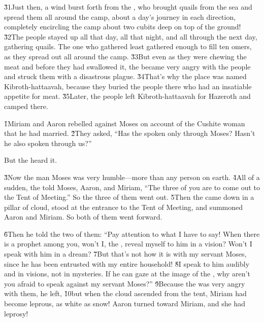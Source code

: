 \v{31}Just then, a wind burst forth from the , who brought quails from the sea and spread them all around the camp, about a day's journey in each direction, completely encircling the camp about two cubits deep on top of the ground! \v{32}The people stayed up all that day, all that night, and all through the next day, gathering quails. The one who gathered least gathered enough to fill ten omers, as they spread out all around the camp. \v{33}But even as they were chewing the meat and before they had swallowed it, the  became very angry with the people and struck them with a disastrous plague. \v{34}That's why the place was named Kibroth-hattaavah, because they buried the people there who had an insatiable appetite for meat. \v{35}Later, the people left Kibroth-hattaavah for Hazeroth and camped there.

\v{1}Miriam and Aaron rebelled against Moses on account of the Cushite woman that he had married. \v{2}They asked, ``Has the  spoken only through Moses? Hasn't he also spoken through us?''

But the  heard it.

\v{3}Now the man Moses was very humble---more than any person on earth. \v{4}All of a sudden, the  told Moses, Aaron, and Miriam, ``The three of you are to come out to the Tent of Meeting.'' So the three of them went out. \v{5}Then the  came down in a pillar of cloud, stood at the entrance to the Tent of Meeting, and summoned Aaron and Miriam. So both of them went forward.

\v{6}Then he told the two of them: ``Pay attention to what I have to say! When there is a prophet among you, won't I, the , reveal myself to him in a vision? Won't I speak with him in a dream? \v{7}But that's not how it is with my servant Moses, since he has been entrusted with my entire household! \v{8}I speak to him audibly and in visions, not in mysteries. If he can gaze at the image of the , why aren't you afraid to speak against my servant Moses?'' \v{9}Because the  was very angry with them, he left, \v{10}but when the cloud ascended from the tent, Miriam had become leprous, as white as snow! Aaron turned toward Miriam, and she had leprosy!

